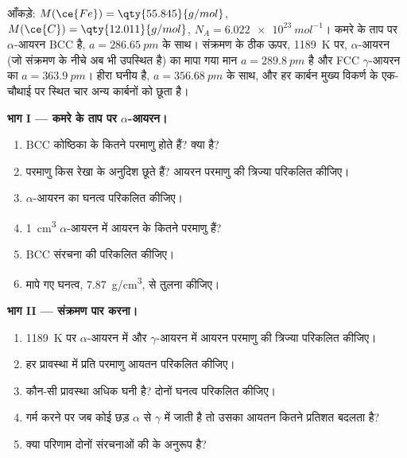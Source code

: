 \begin{problem}
\label{pb:b1:crystals-metals:1}
आँकड़े: $M(\ce{Fe}) = \qty{55.845}{g/mol}$, $M(\ce{C}) = \qty{12.011}{g/mol}$,
$N_A = \qty{6.022e23}{mol^{-1}}$। कमरे के ताप पर $\alpha$-आयरन BCC है,
$a = \qty{286.65}{pm}$ के साथ। संक्रमण के ठीक ऊपर, \qty{1189}{K} पर,
$\alpha$-आयरन (जो संक्रमण के नीचे अब भी उपस्थित है) का मापा गया मान
$a = \qty{289.8}{pm}$ है और FCC $\gamma$-आयरन का $a = \qty{363.9}{pm}$।
हीरा घनीय है, $a = \qty{356.68}{pm}$ के साथ, और हर कार्बन मुख्य विकर्ण के एक-चौथाई
पर स्थित चार अन्य कार्बनों को छूता है।

\medskip
\noindent\textbf{भाग I --- कमरे के ताप पर $\alpha$-आयरन।}
\begin{enumerate}
  \item BCC कोष्ठिका के कितने परमाणु होते हैं?  क्या है?
  \item परमाणु किस रेखा के अनुदिश छूते हैं? आयरन परमाणु की त्रिज्या
        परिकलित कीजिए।
  \item $\alpha$-आयरन का घनत्व परिकलित कीजिए।
  \item \qty{1}{cm^3} $\alpha$-आयरन में आयरन के कितने परमाणु हैं?
  \item BCC संरचना की  परिकलित कीजिए।
  \item मापे गए घनत्व, \qty{7.87}{g/cm^3}, से तुलना कीजिए।
\end{enumerate}

\medskip
\noindent\textbf{भाग II --- संक्रमण पार करना।}
\begin{enumerate}[resume]
  \item \qty{1189}{K} पर $\alpha$-आयरन में और
        $\gamma$-आयरन में आयरन परमाणु की त्रिज्या परिकलित कीजिए।
  \item हर प्रावस्था में प्रति परमाणु आयतन परिकलित कीजिए।
  \item कौन-सी प्रावस्था अधिक घनी है? दोनों घनत्व परिकलित कीजिए।
  \item गर्म करने पर जब कोई छड़ $\alpha$ से $\gamma$ में जाती है तो उसका आयतन
        कितने प्रतिशत बदलता है?
  \item क्या परिणाम दोनों संरचनाओं की  के
        अनुरूप है?
\end{enumerate}


\end{problem}
